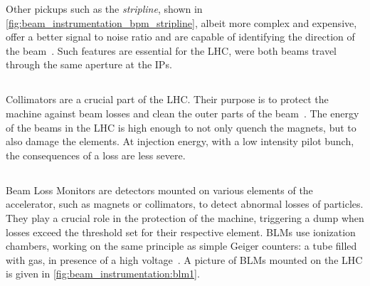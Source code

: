 Other pickups such as the \textit{stripline}, shown in
\cref{fig:beam_instrumentation_bpm_stripline}, albeit more complex and expensive, offer a better
signal to noise ratio and are capable of identifying the direction of the
beam~\cite{wendt_bpm_2020}. Such features are essential for the LHC, were both beams travel through
the same aperture at the IPs.\\ 


 
\subsection{}

Collimators are a crucial part of the LHC. Their purpose is to protect the machine against beam
losses and clean the outer parts of the beam~\cite{redaelli_lhc_2011}. The energy of the beams in
the LHC is high enough to not only quench the magnets, but to also damage the elements. At
injection energy, with a low intensity pilot bunch, the consequences of a loss are less severe.



\subsection{}

Beam Loss Monitors are detectors mounted on various elements of the accelerator, such as magnets or
collimators, to detect abnormal losses of particles. They play a crucial role in the protection of
the machine, triggering a dump when losses exceed the threshold set for their respective element. 
BLMs use ionization chambers, working on the same principle as simple Geiger counters: a tube filled
with gas, in presence of a high voltage~\cite{schmidt_machine_2014}. A picture of BLMs mounted on
the LHC is given in \cref{fig:beam_instrumentation:blm1}.


